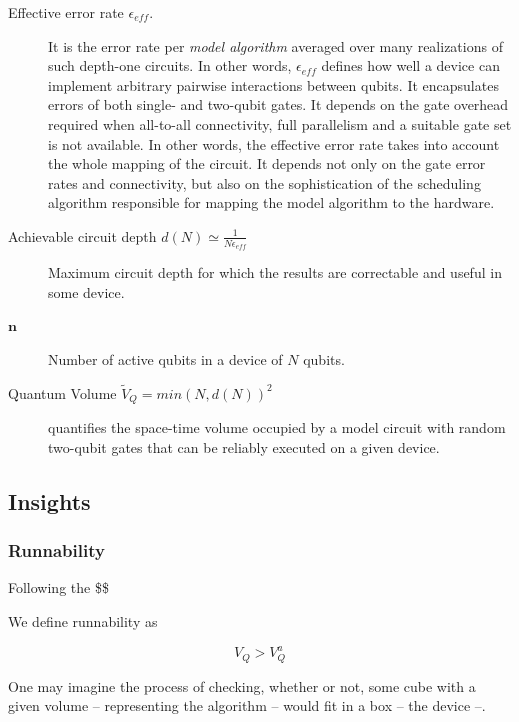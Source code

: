 \documentclass[11pt]{article}
\begin{document}
\begin{description}
\item[{Effective error rate \(\epsilon_{eff}\).}] It is the error rate per \emph{model algorithm} averaged over many realizations of such depth-one circuits. In other words, \(\epsilon_{eff}\) defines how well a device can implement arbitrary pairwise interactions between qubits. It encapsulates errors of both single- and two-qubit gates. It depends on the gate overhead required when all-to-all connectivity, full parallelism and a suitable gate set is not available. In other words, the effective error rate takes into account the whole mapping of the circuit. It depends not only on the gate error rates and connectivity, but also on the sophistication of the scheduling algorithm responsible for mapping the model algorithm to the hardware.

\item[{Achievable circuit depth \(d(N) \simeq \frac{1}{N \epsilon_{eff}}\)}] Maximum circuit depth for which the results are correctable and useful in some device.
\end{description}

\begin{description}
\item[{\(\textbf{n}\)}] Number of active qubits in a device of \(N\) qubits.

\item[{Quantum Volume \(\tilde{V}_Q = min (N, d(N))^2\)}] quantifies the space-time volume occupied by a model circuit with random two-qubit gates that can be reliably executed on a given device.
\end{description}

\subsection{Insights}
\label{sec:orgef4d502}

\subsubsection{Runnability}
\label{sec:org49966df}

Following the \$\$

We define runnability as 

$$V_Q > V_Q^a$$

One may imagine the process of checking, whether or not, some cube with a given volume -- representing the algorithm -- would fit in a box -- the device --.
\end{document}
